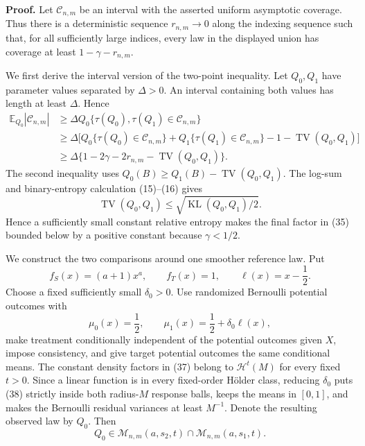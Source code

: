 \textbf{Proof.}
Let \(\mathcal C_{n,m}\) be an interval with the asserted uniform asymptotic coverage. Thus there is a deterministic sequence \(r_{n,m}\to0\) along the indexing sequence such that, for all sufficiently large indices, every law in the displayed union has coverage at least \(1-\gamma-r_{n,m}\).

We first derive the interval version of the two-point inequality. Let \(Q_0,Q_1\) have parameter values separated by \(\Delta>0\). An interval containing both values has length at least \(\Delta\). Hence
\[
\begin{aligned}
\mathbb E_{Q_0}|\mathcal C_{n,m}|
&\ge\Delta Q_0\{\tau(Q_0),\tau(Q_1)\in\mathcal C_{n,m}\}\\
&\ge\Delta\bigl[Q_0\{\tau(Q_0)\in\mathcal C_{n,m}\}
+Q_1\{\tau(Q_1)\in\mathcal C_{n,m}\}
-1-\operatorname{TV}(Q_0,Q_1)\bigr]\\
&\ge\Delta\{1-2\gamma-2r_{n,m}-\operatorname{TV}(Q_0,Q_1)\}.
\end{aligned}
\tag{35}
\]
The second inequality uses \(Q_0(B)\ge Q_1(B)-\operatorname{TV}(Q_0,Q_1)\). The log-sum and binary-entropy calculation (15)--(16) gives
\[
\operatorname{TV}(Q_0,Q_1)\le\sqrt{\operatorname{KL}(Q_0,Q_1)/2}.
\tag{36}
\]
Hence a sufficiently small constant relative entropy makes the final factor in (35) bounded below by a positive constant because \(\gamma<1/2\).

We construct the two comparisons around one smoother reference law. Put
\[
f_S(x)=(a+1)x^a,
\qquad
f_T(x)=1,
\qquad
\ell(x)=x-\frac12.
\tag{37}
\]
Choose a fixed sufficiently small \(\delta_0>0\). Use randomized Bernoulli potential outcomes with
\[
\mu_0(x)=\frac12,
\qquad
\mu_1(x)=\frac12+\delta_0\ell(x),
\tag{38}
\]
make treatment conditionally independent of the potential outcomes given \(X\), impose consistency, and give target potential outcomes the same conditional means. The constant density factors in (37) belong to \(\mathcal H^t(M)\) for every fixed \(t>0\). Since a linear function is in every fixed-order H\"older class, reducing \(\delta_0\) puts (38) strictly inside both radius-\(M\) response balls, keeps the means in \([0,1]\), and makes the Bernoulli residual variances at least \(M^{-1}\). Denote the resulting observed law by \(Q_0\). Then
\[
Q_0\in\mathcal M_{n,m}(a,s_2,t)
\cap\mathcal M_{n,m}(a,s_1,t).
\tag{39}
\]

